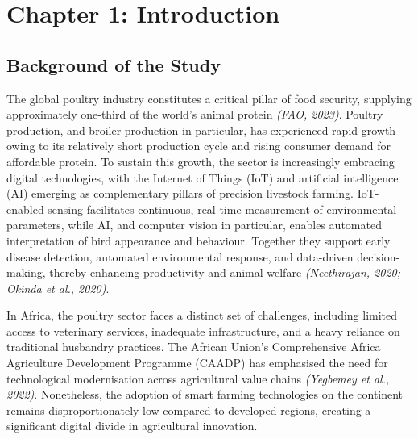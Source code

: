 \documentclass[12pt,a4paper]{report}
\begin{document}
\clearpage
{}

\chapter{Chapter 1: Introduction}
\setcounter{section}{0}
\renewcommand{\thesection}{1.\arabic{section}}
\renewcommand{\thesubsection}{1.\arabic{section}.\arabic{subsection}}

\section{Background of the Study}

The global poultry industry constitutes a critical pillar of food security, supplying approximately one-third of the world's animal protein \textit{(FAO, 2023)}. Poultry production, and broiler production in particular, has experienced rapid growth owing to its relatively short production cycle and rising consumer demand for affordable protein. To sustain this growth, the sector is increasingly embracing digital technologies, with the Internet of Things (IoT) and artificial intelligence (AI) emerging as complementary pillars of precision livestock farming. IoT-enabled sensing facilitates continuous, real-time measurement of environmental parameters, while AI, and computer vision in particular, enables automated interpretation of bird appearance and behaviour. Together they support early disease detection, automated environmental response, and data-driven decision-making, thereby enhancing productivity and animal welfare \textit{(Neethirajan, 2020; Okinda et al., 2020)}.

In Africa, the poultry sector faces a distinct set of challenges, including limited access to veterinary services, inadequate infrastructure, and a heavy reliance on traditional husbandry practices. The African Union's Comprehensive Africa Agriculture Development Programme (CAADP) has emphasised the need for technological modernisation across agricultural value chains \textit{(Yegbemey et al., 2022)}. Nonetheless, the adoption of smart farming technologies on the continent remains disproportionately low compared to developed regions, creating a significant digital divide in agricultural innovation.
\end{document}
